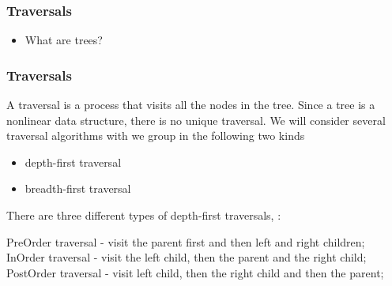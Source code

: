 \documentclass[12pt]{beamer} %
\begin{document}
\begin{frame}
\frametitle{Traversals}
\begin{itemize}
\item What are trees?
\end{itemize}
\end{frame}


\begin{frame}
\frametitle{Traversals}


A traversal is a process that visits all the nodes in the tree. Since a tree is a nonlinear data structure, there is no unique traversal. We will consider several traversal algorithms with we group in the following two kinds

\begin{itemize}
\item depth-first traversal
\item breadth-first traversal
\end{itemize}


\end{frame}
\begin{frame}

There are three different types of depth-first traversals, :

PreOrder traversal - visit the parent first and then left and right children;
InOrder traversal - visit the left child, then the parent and the right child;
PostOrder traversal - visit left child, then the right child and then the parent;

\end{frame}
\end{document}
